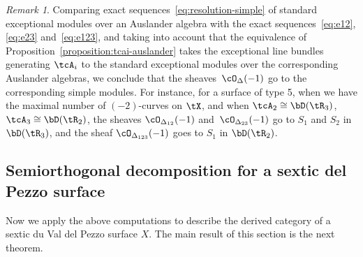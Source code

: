 \documentclass[11pt]{amsart}
\theoremstyle{plain}
\theoremstyle{definition}
\theoremstyle{remark}
\newtheorem{remark}[theorem]{Remark}
\begin{document}
\begin{remark}
\label{remark:delta-simples}
Comparing exact sequences~\eqref{eq:resolution-simple} of standard exceptional modules over an Auslander algebra with the exact sequences~\eqref{eq:e12}, \eqref{eq:e23} and~\eqref{eq:e123},
and taking into account that the equivalence of Proposition~\ref{proposition:tcai-auslander} takes the exceptional line bundles generating $\tcA_i$ 
to the standard exceptional modules over the corresponding Auslander algebras, we conclude that the sheaves~$\cO_\Delta(-1)$ go to the corresponding simple modules.
For instance, for a surface of type 5, when we have the maximal number of $(-2)$-curves on $\tX$, and when $\tcA_2 \cong \bD(\tR_3)$, $\tcA_3 \cong \bD(\tR_2)$, 
the sheaves $\cO_{\Delta_{12}}(-1)$ and~$\cO_{\Delta_{23}}(-1)$ go to $S_1$ and $S_2$ in $\bD(\tR_3)$, and the sheaf $\cO_{\Delta_{123}}(-1)$ goes to $S_1$ in $\bD(\tR_2)$.
\end{remark}





\subsection{Semiorthogonal decomposition for a sextic del Pezzo surface}
\label{subsection:derived-x}

Now we apply the above computations to describe the derived category of a sextic du Val del Pezzo surface $X$.
The main result of this section is the next theorem.
\end{document}
